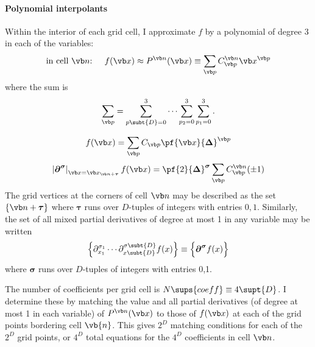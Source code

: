 \documentclass{article}
\renewcommand{\vbsigma}{\boldsymbol{\sigma}}
\newcommand{\vbtau}{\boldsymbol{\tau}}
\begin{document}
\paragraph{Polynomial interpolants}
Within the interior of each grid cell, I approximate $f$ by a polynomial
of degree $3$ in each of the variables:
$$ \text{in cell $\vb n$: \quad }
   f(\vb x) \approx P^{\vb n}(\vb x)
   \equiv \sum_{\vb p} C^{\vb n}_{\vb p} \vb x^{\vb p}
$$
where the sum is
$$ \sum_{\vb p} = \sum_{p\subt{D}=0}^3 \cdots \sum_{p_2=0}^3 \sum_{p_1=0}^3.$$

$$ f(\vb x) = \sum_{\vb p} C_{\vb p}\pf{\vb x}{\boldsymbol\Delta}^{\vb p} $$
$$ \left|
   \boldsymbol{\partial}^{\vbsigma}
   \right|_{\vb x = \vb x_{\vb n+\boldsymbol{\tau}}}
   f(\vb x)
   =\pf{2}{\boldsymbol{\Delta}}^{\vbsigma}\sum_{\vb p}
    C_{\vb p}^{\vb n}(\pm 1)
$$
The grid vertices at the corners of cell $\vb n$ may be
described as the set $\{\vb n + \vbtau\}$ where $\vbtau$
runs over $D$-tuples of integers with entries $0,1$.
Similarly, the set of all
mixed partial derivatives of degree at most 1 in any
variable may be written 
$$ 
 \Big\{
   \partial_{x_1}^{\sigma_1} \cdots \partial_{x\subt{D}}^{\sigma\subt{D}}
  f(x)
 \Big\}
  \equiv 
 \Big \{ \boldsymbol{\partial}^{\vbsigma} f(x) \Big \}
$$
where $\vbsigma$ runs over $D$-tuples of integers with entries 0,1.


The number of coefficients per grid cell is $N\sups{coeff}\equiv 4\supt{D}$.
I determine these by matching the value and all partial
derivatives (of degree at most 1 in each variable) of $P^{\vb n}(\vb x)$
to those of $f(\vb x)$ at each of the grid points bordering cell $\vb{n}$.
This gives $2^D$ matching conditions for each of the $2^D$ grid points,
or $4^D$ total equations for the $4^D$ coefficients in cell $\vb n$.
\end{document}
